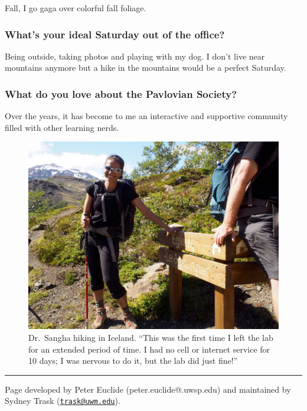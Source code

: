 \documentclass[]{article}
\begin{document}
Fall, I go gaga over colorful fall foliage.

\subsubsection{\texorpdfstring{\textbf{What's your ideal Saturday out of
the
office?}}{What's your ideal Saturday out of the office?}}\label{whats-your-ideal-saturday-out-of-the-office}

Being outside, taking photos and playing with my dog. I don't live near
mountains anymore but a hike in the mountains would be a perfect
Saturday.

\subsubsection{\texorpdfstring{\textbf{What do you love about the
Pavlovian
Society?}}{What do you love about the Pavlovian Society?}}\label{what-do-you-love-about-the-pavlovian-society}

Over the years, it has become to me an interactive and supportive
community filled with other learning nerds.

\begin{figure}
\centering
\includegraphics{./featured_faculty/photos/Sangha_iceland.jpg}
\caption{Dr.~Sangha hiking in Iceland. ``This was the first time I left
the lab for an extended period of time. I had no cell or internet
service for 10 days; I was nervous to do it, but the lab did just
fine!''}
\end{figure}

\begin{center}\rule{0.5\linewidth}{\linethickness}\end{center}

Page developed by Peter Euclide (peter.euclide@.uwsp.edu) and maintained
by Sydney Trask
(\href{mailto:trask@uwm.edu}{\nolinkurl{trask@uwm.edu}}).
\end{document}
